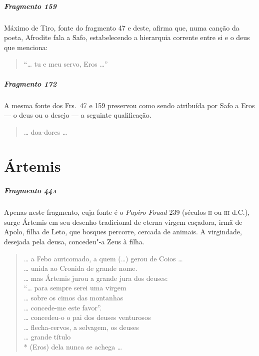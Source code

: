 \paragraph{Fragmento 159}

{\small Máximo de Tiro, fonte do fragmento 47 e deste, afirma que, numa canção da poeta,
Afrodite fala a Safo, estabelecendo a hierarquia corrente entre si e o deus que
menciona:}

\begin{verse}
“\ldots{} tu e meu servo, Eros \ldots{}”
\end{verse}


\paragraph{Fragmento 172}

{\small A mesma fonte dos Frs.~47 e 159 preservou como sendo atribuída por Safo a Eros --- o deus ou o desejo --- a seguinte qualificação.}

\begin{verse}
\ldots{} doa-dores \ldots{} 
\end{verse}

\chapter{Ártemis}

\paragraph{Fragmento 44\textsc{a}}

{\small Apenas neste fragmento, cuja fonte é o \textit{Papiro Fouad }239 (séculos \textsc{ii} ou
\textsc{iii} d.C.), surge Ártemis em seu desenho tradicional de eterna virgem caçadora,
irmã de Apolo, filha de Leto, que bosques percorre, cercada de animais. A
virgindade, desejada pela deusa, concedeu"-a Zeus à filha.}

\begin{verse}
\ldots{} a Febo auricomado, a quem (\ldots{}) gerou de Coios \ldots{}\\
\ldots{} unida ao Cronida de grande nome.\\
\ldots{} mas Ártemis jurou a grande jura dos deuses:\\
``\ldots{} para sempre serei uma virgem\\
\ldots{} sobre os cimos das montanhas\\
\ldots{} concede-me este favor''.\\
\ldots{} concedeu-o o pai dos deuses venturosos\\
\ldots{} flecha-cervos, a selvagem, os deuses\\
\ldots{} grande título\\*
(Eros) dela nunca se achega \ldots{}
\end{verse}


